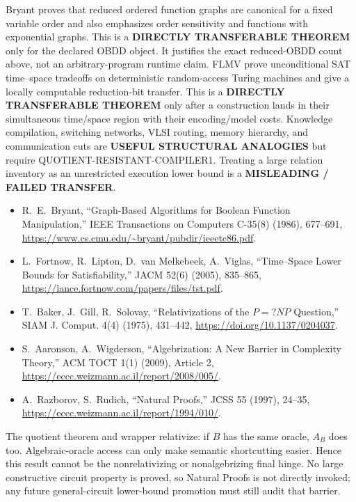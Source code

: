 \documentclass[11pt]{article}
\begin{document}
Bryant proves that reduced ordered function graphs are canonical for a fixed
variable order and also emphasizes order sensitivity and functions with
exponential graphs.  This is a \textbf{DIRECTLY TRANSFERABLE THEOREM} only
for the declared OBDD object.  It justifies the exact reduced-OBDD count
above, not an arbitrary-program runtime claim.  FLMV prove unconditional
SAT time--space tradeoffs on deterministic random-access Turing machines and
give a locally computable reduction-bit transfer.  This is a
\textbf{DIRECTLY TRANSFERABLE THEOREM} only after a construction lands in
their simultaneous time/space region with their encoding/model costs.
Knowledge compilation, switching networks, VLSI routing, memory hierarchy,
and communication cuts are \textbf{USEFUL STRUCTURAL ANALOGIES} but require
QUOTIENT-RESISTANT-COMPILER1.  Treating a large relation inventory as an
unrestricted execution lower bound is a \textbf{MISLEADING / FAILED
TRANSFER}.

\begin{itemize}[leftmargin=*]
\item R.~E.~Bryant, ``Graph-Based Algorithms for Boolean Function
Manipulation,'' IEEE Transactions on Computers C-35(8) (1986), 677--691,
\url{https://www.cs.cmu.edu/~bryant/pubdir/ieeetc86.pdf}.
\item L.~Fortnow, R.~Lipton, D.~van Melkebeek, A.~Viglas,
``Time--Space Lower Bounds for Satisfiability,'' JACM 52(6) (2005),
835--865, \url{https://lance.fortnow.com/papers/files/tst.pdf}.
\item T.~Baker, J.~Gill, R.~Solovay, ``Relativizations of the $P=?NP$
Question,'' SIAM J. Comput. 4(4) (1975), 431--442,
\url{https://doi.org/10.1137/0204037}.
\item S.~Aaronson, A.~Wigderson, ``Algebrization: A New Barrier in
Complexity Theory,'' ACM TOCT 1(1) (2009), Article 2,
\url{https://eccc.weizmann.ac.il/report/2008/005/}.
\item A.~Razborov, S.~Rudich, ``Natural Proofs,'' JCSS 55 (1997), 24--35,
\url{https://eccc.weizmann.ac.il/report/1994/010/}.
\end{itemize}

The quotient theorem and wrapper relativize: if $B$ has the same oracle,
$A_B$ does too.  Algebraic-oracle access can only make semantic shortcutting
easier.  Hence this result cannot be the nonrelativizing or
nonalgebrizing final hinge.  No large constructive circuit property is
proved, so Natural Proofs is not directly invoked; any future general-circuit
lower-bound promotion must still audit that barrier.
\end{document}
